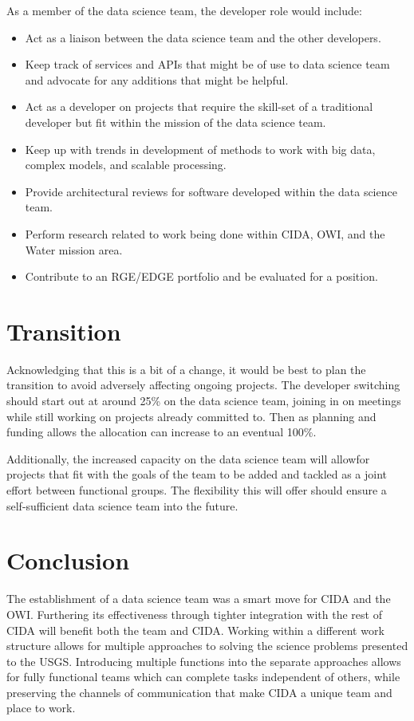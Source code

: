 \documentclass[twocolumn]{article}
\begin{document}
As a member of the data science team, the developer role would include:
\begin{itemize}
	\item Act as a liaison between the data science team and the other developers.
	\item Keep track of services and APIs that might be of use to data science team and advocate for any additions that might be helpful.
	\item Act as a developer on projects that require the skill-set of a traditional developer but fit within the mission of the data science team.
	\item Keep up with trends in development of methods to work with big data, complex models, and scalable processing.
	\item Provide architectural reviews for software developed within the data science team.
	\item Perform research related to work being done within CIDA, OWI, and the Water mission area.
	\item Contribute to an RGE/EDGE portfolio and be evaluated for a position.
\end{itemize}

\section{Transition}

Acknowledging that this is a bit of a change, it would be best to plan the transition to avoid adversely affecting ongoing projects.
The developer switching should start out at around 25\% on the data science team, joining in on meetings while still working on projects already committed to.
Then as planning and funding allows the allocation can increase to an eventual 100\%.

\par
Additionally, the increased capacity on the data science team will allowfor projects that fit with the goals of the team to be added and tackled as a joint effort between functional groups.
The flexibility this will offer should ensure a self-sufficient data science team into the future.

\section{Conclusion}

The establishment of a data science team was a smart move for CIDA and the OWI.
Furthering its effectiveness through tighter integration with the rest of CIDA will benefit both the team and CIDA.
Working within a different work structure allows for multiple approaches to solving the science problems presented to the USGS.
Introducing multiple functions into the separate approaches allows for fully functional teams which can complete tasks independent of others, while preserving the channels of communication that make CIDA a unique team and place to work.



\end{document}
